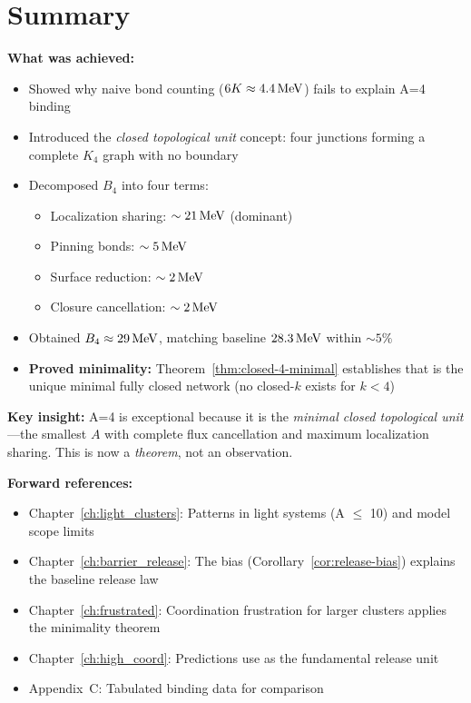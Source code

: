 \section{Summary}
\label{sec:he4:summary}

\begin{resultbox}
    \textbf{What was achieved:}
    \begin{itemize}
        \item Showed why naive bond counting ($6K \approx 4.4\,\mathrm{MeV}$)
              fails to explain A=4 binding
        \item Introduced the \emph{closed topological unit} concept:
              four junctions forming a complete $K_4$ graph with
              no boundary
        \item Decomposed $B_4$ into four terms:
              \begin{itemize}
                  \item Localization sharing: $\sim 21\,\mathrm{MeV}$ (dominant)
                  \item Pinning bonds: $\sim 5\,\mathrm{MeV}$
                  \item Surface reduction: $\sim 2\,\mathrm{MeV}$
                  \item Closure cancellation: $\sim 2\,\mathrm{MeV}$
              \end{itemize}
        \item Obtained $B_4 \approx 29\,\mathrm{MeV}$, matching baseline
              $28.3\,\mathrm{MeV}$ within $\sim 5\%$
        \item \textbf{Proved minimality:} Theorem~\ref{thm:closed-4-minimal}
              establishes that \ClosedFour{} is the unique minimal fully
              closed \Junction{} network (no closed-$k$ exists for $k < 4$)
    \end{itemize}

    \textbf{Key insight:} A=4 is exceptional because it is the
    \emph{minimal closed topological unit}---the smallest $A$ with
    complete flux cancellation and maximum localization sharing.
    This is now a \emph{theorem}, not an observation.
\end{resultbox}

\bigskip
\noindent
\textbf{Forward references:}
\begin{itemize}
    \item Chapter~\ref{ch:light_clusters}: Patterns in light systems
          (A $\leq$ 10) and model scope limits
    \item Chapter~\ref{ch:barrier_release}: The \ClosedFourRelease{} bias
          (Corollary~\ref{cor:release-bias}) explains the baseline release law
    \item Chapter~\ref{ch:frustrated}: Coordination frustration for
          larger clusters applies the minimality theorem
    \item Chapter~\ref{ch:high_coord}: Predictions use \ClosedFour{}
          as the fundamental release unit
    \item Appendix~C: Tabulated binding data for comparison
\end{itemize}

